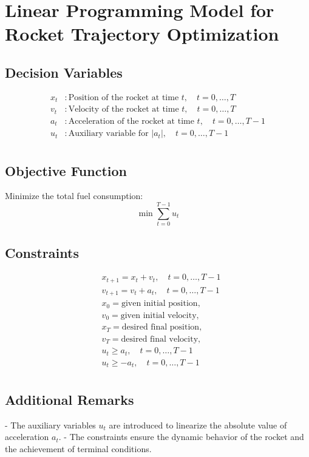 \documentclass{article}
\begin{document}
\section*{Linear Programming Model for Rocket Trajectory Optimization}

\subsection*{Decision Variables}
\begin{align*}
x_t & : \text{Position of the rocket at time } t, \quad t = 0, \ldots, T \\
v_t & : \text{Velocity of the rocket at time } t, \quad t = 0, \ldots, T \\
a_t & : \text{Acceleration of the rocket at time } t, \quad t = 0, \ldots, T-1 \\
u_t & : \text{Auxiliary variable for } |a_t|, \quad t = 0, \ldots, T-1 \\
\end{align*}

\subsection*{Objective Function}
Minimize the total fuel consumption:
\[
\min \sum_{t=0}^{T-1} u_t
\]

\subsection*{Constraints}
\begin{align*}
& x_{t+1} = x_t + v_t, \quad t = 0, \ldots, T-1 \\
& v_{t+1} = v_t + a_t, \quad t = 0, \ldots, T-1 \\
& x_0 = \text{given initial position}, \\
& v_0 = \text{given initial velocity}, \\
& x_T = \text{desired final position}, \\
& v_T = \text{desired final velocity}, \\
& u_t \geq a_t, \quad t = 0, \ldots, T-1 \\
& u_t \geq -a_t, \quad t = 0, \ldots, T-1 \\
\end{align*}

\subsection*{Additional Remarks}
- The auxiliary variables \(u_t\) are introduced to linearize the absolute value of acceleration \(a_t\).
- The constraints ensure the dynamic behavior of the rocket and the achievement of terminal conditions.
\end{document}
